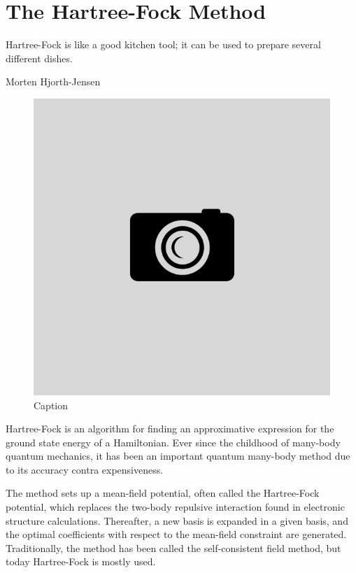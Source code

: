 \chapter{The Hartree-Fock Method} \label{chp:hartreefock}
\epigraph{Hartree-Fock is like a good kitchen tool; it can be used to prepare several different dishes.}{Morten Hjorth-Jensen}
\begin{figure}[H]
	\centering
	\includegraphics[scale=0.4]{Images/example.png}
	\caption{Caption}
\end{figure}
Hartree-Fock is an algorithm for finding an approximative expression for the ground state energy of a Hamiltonian. Ever since the childhood of many-body quantum mechanics, it has been an important quantum many-body method due to its accuracy contra expensiveness. 

The method sets up a mean-field potential, often called the Hartree-Fock potential, which replaces the two-body repulsive interaction found in electronic structure calculations. Thereafter, a new basis is expanded in a given basis, and the optimal coefficients with respect to the mean-field constraint are generated. Traditionally, the method has been called the self-consistent field method, but today Hartree-Fock is mostly used. 

